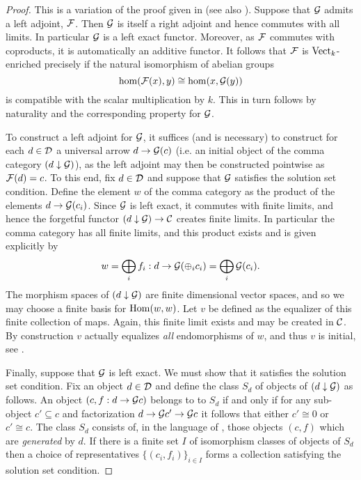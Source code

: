 \documentclass{amsart}
\begin{document}
\begin{proof} This is a variation of the proof given in \cite[V.6.Thm 2]{MR0354798} (see also \cite[Ex. 3-M]{MR0166240}).
Suppose that $\mathcal G$ admits a left adjoint, $\mathcal F$. Then $\mathcal G$ is itself a right adjoint and hence commutes with all limits. In particular $\mathcal G$ is a left exact functor. Moreover, as $\mathcal F$ commutes with coproducts, it is automatically an additive functor. It follows that $\mathcal F$ is ${\mathrm{Vect}_k}$-enriched precisely if the natural isomorphism of abelian groups 
\begin{equation*}
	\hom( \mathcal F(x), y) \cong \hom(x, \mathcal G(y))
\end{equation*}
is compatible with the scalar multiplication by $k$. This in turn follows by naturality and the corresponding property for $\mathcal G$. 


To construct a left adjoint for $\mathcal G$, it suffices (and is necessary) to construct for each $d \in \mathcal D$ a universal arrow $d \to \mathcal G(c)$ (i.e. an initial object of the comma category $(d \downarrow \mathcal G)$),
as the left adjoint may then be constructed pointwise as $\mathcal F(d) = c$. To this end, fix $d \in \mathcal D$ and suppose that $\mathcal G$ satisfies the solution set condition. Define the element $w$ of the comma category as the product of the elements $d \to \mathcal G(c_i)$. Since $\mathcal G$ is left exact, it commutes with finite limits, and hence the forgetful functor $(d \downarrow \mathcal G) \to \mathcal C$ creates finite limits. In particular the comma category has all finite limits, and this  product exists and is given explicitly by 
\begin{equation*}
	w = \bigoplus_i f_i :  d \to \mathcal G( \oplus_i c_i) = \bigoplus_i \mathcal G(c_i).
\end{equation*}
The morphism spaces of $(d \downarrow \mathcal G)$ are finite dimensional vector spaces, and so we may choose a finite basis for $\operatorname{Hom}(w,w)$. Let $v$ be defined as the equalizer of this finite collection of maps. Again, this finite limit exists and may be created in $\mathcal C$. By construction $v$ actually equalizes {\em all} endomorphisms of $w$, and thus $v$ is initial, see  \cite[V.6.Thm 1]{MR0354798}.

Finally, suppose that $\mathcal G$ is left exact. We must show that it satisfies the solution set condition. Fix an object $d \in \mathcal D$ and define the class $S_d$ of objects of $(d \downarrow \mathcal G)$ as follows. An object $(c, f:d \to \mathcal G c)$ belongs to to $S_d$ if and only if for any sub-object $c' \subseteq c$ and factorization $d \to \mathcal G c' \to \mathcal G c$ it follows that either $c' \cong 0$ or $c' \cong c$. The class $S_d$ consists of, in the language of \cite[Ex. 3-J]{MR0166240}, those objects $(c,f)$ which are {\em generated} by $d$. If there is a finite set $I$ of isomorphism classes of objects of $S_d$ then a choice of representatives $\{(c_i, f_i)\}_{i \in I}$ forms a collection satisfying the solution set condition. 


\end{proof}
\end{document}
